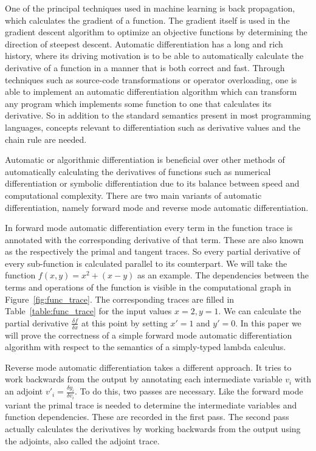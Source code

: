 \documentclass[11pt, final]{article}
\begin{document}

One of the principal techniques used in machine learning is back propagation, which calculates the gradient of a function. The gradient itself is used in the gradient descent algorithm to optimize an objective functions by determining the direction of steepest descent\cite{Baydin2015AutomaticDI}.
Automatic differentiation has a long and rich history, where its driving motivation is to be able to automatically calculate the derivative of a function in a manner that is both correct and fast.
Through techniques such as source-code transformations or operator overloading, one is able to implement an automatic differentiation algorithm which can transform any program which implements some function to one that calculates its derivative.
So in addition to the standard semantics present in most programming languages, concepts relevant to differentiation such as derivative values and the chain rule are needed.

Automatic or algorithmic differentiation is beneficial over other methods of automatically calculating the derivatives of functions such as numerical differentiation or symbolic differentiation due to its balance between speed and computational complexity.
There are two main variants of automatic differentiation, namely forward mode and reverse mode automatic differentiation.

In forward mode automatic differentiation every term in the function trace is annotated with the corresponding derivative of that term. These are also known as the respectively the primal and tangent traces. So every partial derivative of every sub-function is calculated parallel to its counterpart. We will take the function $f(x, y) = x^2 + (x - y)$ as an example. The dependencies between the terms and operations of the function is visible in the computational graph in Figure~\ref{fig:func_trace}. The corresponding traces are filled in Table~\ref{table:func_trace} for the input values $x = 2, y = 1$. We can calculate the partial derivative $\frac{\delta f}{\delta x}$ at this point by setting $x' = 1$ and $y' = 0$. In this paper we will prove the correctness of a simple forward mode automatic differentiation algorithm with respect to the semantics of a simply-typed lambda calculus.

Reverse mode automatic differentiation takes a different approach. It tries to work backwards from the output by annotating each intermediate variable $v_i$ with an adjoint $v'_i=\frac{\delta y_i}{\delta v_i}$. To do this, two passes are necessary. Like the forward mode variant the primal trace is needed to determine the intermediate variables and function dependencies. These are recorded in the first pass. The second pass actually calculates the derivatives by working backwards from the output using the adjoints, also called the adjoint trace.
\end{document}
